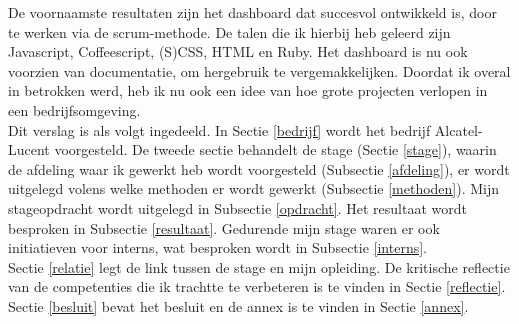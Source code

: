 \documentclass[10pt,a4paper]{article}
\begin{document}
De voornaamste resultaten zijn het dashboard dat succesvol ontwikkeld is, door te werken via de scrum-methode. De talen die ik hierbij heb geleerd zijn Javascript, Coffeescript, (S)CSS, HTML en Ruby. Het dashboard is nu ook voorzien van documentatie, om hergebruik te vergemakkelijken. Doordat ik overal in betrokken werd, heb ik nu ook een idee van hoe grote projecten verlopen in een bedrijfsomgeving.\\

Dit verslag is als volgt ingedeeld. In Sectie \ref{bedrijf} wordt het bedrijf Alcatel-Lucent voorgesteld. De tweede sectie behandelt de stage (Sectie \ref{stage}), waarin de afdeling waar ik gewerkt heb wordt voorgesteld (Subsectie \ref{afdeling}), er wordt uitgelegd volens welke methoden er wordt gewerkt (Subsectie \ref{methoden}). Mijn stageopdracht wordt uitgelegd in Subsectie \ref{opdracht}. Het resultaat wordt besproken in Subsectie \ref{resultaat}. Gedurende mijn stage waren er ook initiatieven voor interns, wat besproken wordt in Subsectie \ref{interns}.\\
Sectie \ref{relatie} legt de link tussen de stage en mijn opleiding. De kritische reflectie van de competenties die ik trachtte te verbeteren is te vinden in Sectie \ref{reflectie}. Sectie \ref{besluit} bevat het besluit en de annex is te vinden in Sectie \ref{annex}.
\end{document}
